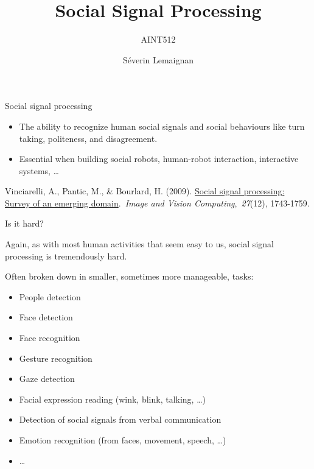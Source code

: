 \documentclass[compress]{beamer}
\title{Social Signal Processing}
\subtitle{AINT512}
\date{}
\author{Séverin Lemaignan}
\institute{Centre for Neural Systems and Robotics\\{\bf Plymouth University}}
\providecommand{\tightlist}{%
  \setlength{\itemsep}{0pt}\setlength{\parskip}{0pt}}
\begin{document}

\maketitle

\begin{frame}{Social signal processing}

\begin{itemize}
\tightlist
\item
  The ability to recognize human social signals and social behaviours
  like turn taking, politeness, and disagreement.
\item
  Essential when building social robots, human-robot interaction,
  interactive systems, \ldots{}
\end{itemize}

Vinciarelli, A., Pantic, M., \& Bourlard, H. (2009).
\href{http://www.dcs.gla.ac.uk/~vincia/papers/sspsurvey.pdf}{Social
signal processing: Survey of an emerging domain}.~\emph{Image and Vision
Computing},~\emph{27}(12), 1743-1759.

\end{frame}

\begin{frame}{Is it hard?}

Again, as with most human activities that seem easy to us, social signal
processing is tremendously hard.

Often broken down in smaller, sometimes more manageable, tasks:

\begin{itemize}
\tightlist
\item
  People detection
\item
  Face detection
\item
  Face recognition
\item
  Gesture recognition
\item
  Gaze detection
\item
  Facial expression reading (wink, blink, talking, \ldots{})
\item
  Detection of social signals from verbal communication
\item
  Emotion recognition (from faces, movement, speech, \ldots{})
\item
  \ldots{}
\end{itemize}

\end{frame}
\end{document}
